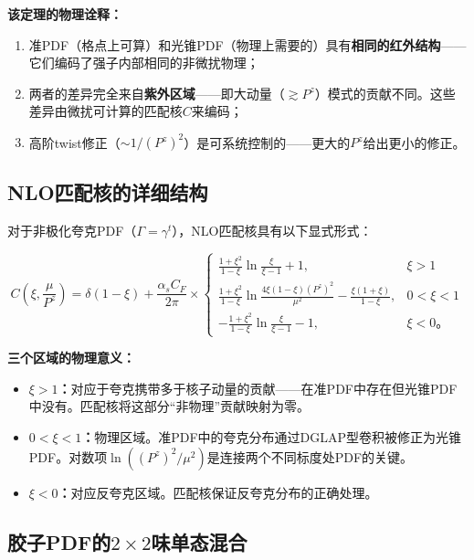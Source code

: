 \documentclass[12pt,a4paper]{ctexart}
\theoremstyle{definition}
\begin{document}
\textbf{该定理的物理诠释：}

\begin{enumerate}
    \item 准PDF（格点上可算）和光锥PDF（物理上需要的）具有\textbf{相同的红外结构}——它们编码了强子内部相同的非微扰物理；
    \item 两者的差异完全来自\textbf{紫外区域}——即大动量（$\gtrsim P^z$）模式的贡献不同。这些差异由微扰可计算的匹配核$C$来编码；
    \item 高阶twist修正（$\sim 1/(P^z)^2$）是可系统控制的——更大的$P^z$给出更小的修正。
\end{enumerate}

\subsection{NLO匹配核的详细结构}

对于非极化夸克PDF（$\Gamma = \gamma^t$），NLO匹配核具有以下显式形式\cite{Liu2019isovector}：

\begin{equation}
C\left(\xi, \frac{\mu}{P^z}\right) = \delta(1-\xi) + \frac{\alpha_s C_F}{2\pi} \times
\begin{cases}
\frac{1+\xi^2}{1-\xi} \ln\frac{\xi}{\xi-1} + 1, & \xi > 1 \\[8pt]
\frac{1+\xi^2}{1-\xi} \ln\frac{4\xi(1-\xi)(P^z)^2}{\mu^2} - \frac{\xi(1+\xi)}{1-\xi}, & 0 < \xi < 1 \\[8pt]
-\frac{1+\xi^2}{1-\xi} \ln\frac{\xi}{\xi-1} - 1, & \xi < 0。
\end{cases}
\label{eq:NLO_matching}
\end{equation}

\textbf{三个区域的物理意义：}
\begin{itemize}
    \item \textbf{$\xi > 1$：}对应于夸克携带多于核子动量的贡献——在准PDF中存在但光锥PDF中没有。匹配核将这部分``非物理''贡献映射为零。
    \item \textbf{$0 < \xi < 1$：}物理区域。准PDF中的夸克分布通过DGLAP型卷积被修正为光锥PDF。对数项$\ln((P^z)^2/\mu^2)$是连接两个不同标度处PDF的关键。
    \item \textbf{$\xi < 0$：}对应反夸克区域。匹配核保证反夸克分布的正确处理。
\end{itemize}

\subsection{胶子PDF的$2\times2$味单态混合}
\end{document}
